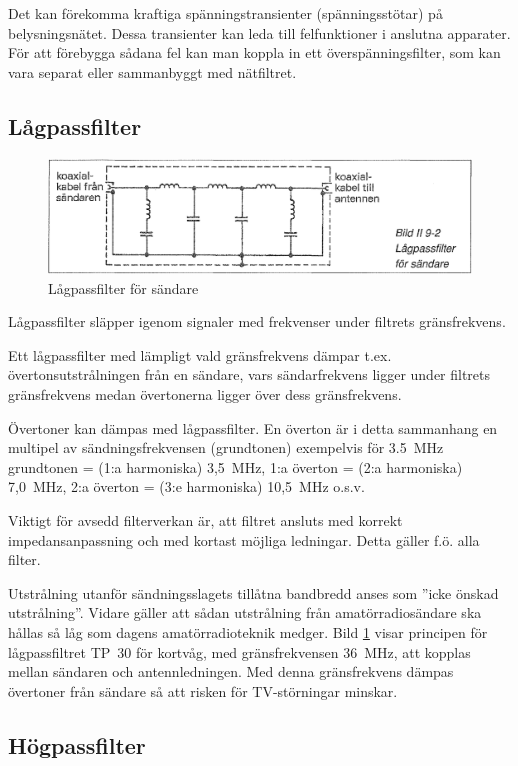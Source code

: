 Det kan förekomma kraftiga spänningstransienter (spänningsstötar) på
belysningsnätet. Dessa transienter kan leda till felfunktioner i anslutna
apparater. För att förebygga sådana fel kan man koppla in ett
överspänningsfilter, som kan vara separat eller sammanbyggt med nätfiltret.

\subsection{Lågpassfilter}

\begin{figure}
  \includegraphics[width=\textwidth]{images/bild_2_9-02}
  \caption{Lågpassfilter för sändare}
  \label{fig:bildII9-2}
\end{figure}

Lågpassfilter släpper igenom signaler med frekvenser under filtrets
gränsfrekvens.

Ett lågpassfilter med lämpligt vald gränsfrekvens dämpar t.ex.
övertonsutstrålningen från en sändare, vars sändarfrekvens ligger under filtrets
gränsfrekvens medan övertonerna ligger över dess gränsfrekvens.

Övertoner kan dämpas med lågpassfilter. En överton är i detta sammanhang en
multipel av sändningsfrekvensen (grundtonen) exempelvis för 3.5~MHz
grundtonen = (1:a harmoniska) 3,5~MHz, 1:a överton = (2:a harmoniska) 7,0~MHz,
2:a överton = (3:e harmoniska) 10,5~MHz o.s.v.

Viktigt för avsedd filterverkan är, att filtret ansluts med korrekt
impedansanpassning och med kortast möjliga ledningar. Detta gäller
f.ö. alla filter.

Utstrålning utanför sändningsslagets tillåtna bandbredd anses som
''icke önskad utstrålning''. Vidare gäller att sådan utstrålning från
amatörradiosändare ska hållas så låg som dagens amatörradioteknik medger.
Bild \ref{fig:bildII9-2} visar principen för lågpassfiltret TP~30 för kortvåg,
med gränsfrekvensen 36~MHz, att kopplas mellan sändaren och antennledningen.
Med denna gränsfrekvens dämpas övertoner från sändare så att risken för
TV-störningar minskar.

\subsection{Högpassfilter}


